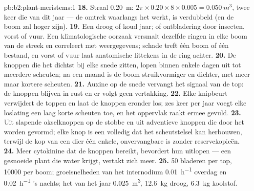 \begin{solution}{pb:b2:plant-meristems:1}
\textbf{18.} Straal \qty{0.20}{m}: $2\pi\times 0.20\times 8\times
0.005 = \qty{0.050}{m^3}$, twee keer die van dit jaar --- de omtrek
waarlangs het  werkt, is verdubbeld (en de boom zal hoger zijn).
\textbf{19.} Een droog of koud jaar; of ontbladering door insecten, vorst of
vuur. Een klimatologische oorzaak versmalt dezelfde ringen in elke boom van
de streek en correleert met weergegevens; schade treft één boom of één
bestand, en vorst of vuur laat anatomische littekens in de ring achter.
\textbf{20.} De knoppen die het dichtst bij elke snede zitten, lopen binnen
enkele dagen uit tot meerdere scheuten; na een maand is de boom
struikvormiger en dichter, met meer maar kortere scheuten.
\textbf{21.} Auxine op de snede vervangt het signaal van de top: de knoppen
blijven in rust en er volgt geen vertakking.
\textbf{22.} Elke knipbeurt verwijdert de toppen en laat de knoppen eronder
los; zes keer per jaar voegt elke loslating een laag korte scheuten toe, en
het oppervlak raakt ermee gevuld.
\textbf{23.} Uit slapende okselknoppen op de stobbe en uit adventieve
knoppen die door het  worden gevormd; elke knop is een volledig
 dat het scheutstelsel kan herbouwen, terwijl de kop van een dier
één enkele, onvervangbare  is zonder reservekopieën.
\textbf{24.} Meer cytokinine dat de knoppen bereikt, bevordert hun
uitlopen --- een gesnoeide plant die water krijgt, vertakt zich meer.
\textbf{25.} 50 bladeren per top, \num{10000} per boom; groeisnelheden van
het internodium \qty{0.01}{h^{-1}} overdag en \qty{0.02}{h^{-1}} 's nachts;
het  van het jaar \qty{0.025}{m^3}, \qty{12.6}{kg} droog, \qty{6.3}{kg}
koolstof.
\end{solution}
